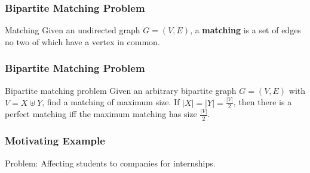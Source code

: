 \documentclass{beamer}
\begin{document}
\begin{frame}%
\frametitle{Bipartite Matching Problem}

\begin{block}{Matching}
Given an undirected graph $G = (V, E)$, a \textbf{matching} is a set of edges no two of which have a vertex in common.
\end{block}


\end{frame}

\begin{frame}%
\frametitle{Bipartite Matching Problem}

\begin{block}{Bipartite matching problem}
Given an arbitrary bipartite graph $G = (V, E)$ with $V = X \uplus Y$, find a matching of maximum size. If
$|X| = |Y| = \frac{|V|}{2}$, then there is a perfect matching iff the maximum matching has size $\frac{|V|}{2}$.
\end{block}


\end{frame}

\begin{frame}%
\frametitle{Motivating Example}

\begin{mdframed}[style=exampledefault]
Problem: Affecting students to companies for internships.
\end{mdframed}


\end{frame}
\end{document}
